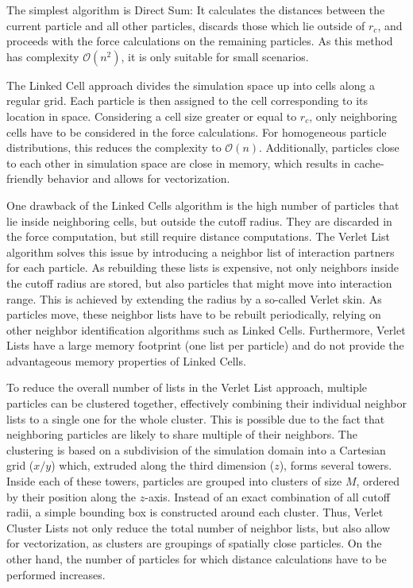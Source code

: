 \begin{description}[leftmargin=!,labelwidth=\widthof{\textbf{Verlet Cluster Lists}}]
	\item[\textbf{Direct Sum}] The simplest algorithm is Direct Sum: It calculates the distances between the current particle and all other particles, discards those which lie outside of $r_c$, and proceeds with the force calculations on the remaining particles. As this method has complexity $\mathcal{O}\left(n^2\right)$, it is only suitable for small scenarios.
	\item[\textbf{Linked Cells}] The Linked Cell approach divides the simulation space up into cells along a regular grid. Each particle is then assigned to the cell corresponding to its location in space. Considering a cell size greater or equal to $r_c$, only neighboring cells have to be considered in the force calculations. For homogeneous particle distributions, this reduces the complexity to $\mathcal{O}\left(n\right)$. Additionally, particles close to each other in simulation space are close in memory, which results in cache-friendly behavior and allows for vectorization.
	\item[\textbf{Verlet Lists}] One drawback of the Linked Cells algorithm is the high number of particles that lie inside neighboring cells, but outside the cutoff radius. They are discarded in the force computation, but still require distance computations. The Verlet List algorithm solves this issue by introducing a neighbor list of interaction partners for each particle. As rebuilding these lists is expensive, not only neighbors inside the cutoff radius are stored, but also particles that might move into interaction range. This is achieved by extending the radius by a so-called Verlet skin. As particles move, these neighbor lists have to be rebuilt periodically, relying on other neighbor identification algorithms such as Linked Cells. Furthermore, Verlet Lists have a large memory footprint (one list per particle) and do not provide the advantageous memory properties of Linked Cells.
	\item[\textbf{Verlet Cluster Lists}] To reduce the overall number of lists in the Verlet List approach, multiple particles can be clustered together, effectively combining their individual neighbor lists to a single one for the whole cluster. This is possible due to the fact that neighboring particles are likely to share multiple of their neighbors. The clustering is based on a subdivision of the simulation domain into a Cartesian grid ($x/y$) which, extruded along the third dimension ($z$), forms several towers. Inside each of these towers, particles are grouped into clusters of size $M$, ordered by their position along the $z$-axis. Instead of an exact combination of all cutoff radii, a simple bounding box is constructed around each cluster. Thus, Verlet Cluster Lists not only reduce the total number of neighbor lists, but also allow for vectorization, as clusters are groupings of spatially close particles. On the other hand, the number of particles for which distance calculations have to be performed increases.
\end{description}

